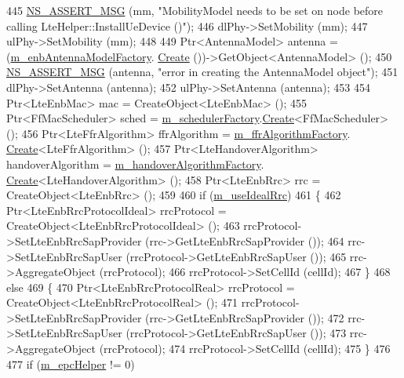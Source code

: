 \begin{DoxyCode}
445   \hyperlink{assert_8h_aff5ece9066c74e681e74999856f08539}{NS\_ASSERT\_MSG} (mm, \textcolor{stringliteral}{"MobilityModel needs to be set on node before calling
       LteHelper::InstallUeDevice ()"});
446   dlPhy->SetMobility (mm);
447   ulPhy->SetMobility (mm);
448 
449   Ptr<AntennaModel> antenna = (\hyperlink{classns3_1_1LteHelper_af5ae4f0a3c7ea76ee9cdb2a13a7b296c}{m\_enbAntennaModelFactory}.
      \hyperlink{classns3_1_1ObjectFactory_a18152e93f0a6fe184ed7300cb31e9896}{Create} ())->GetObject<AntennaModel> ();
450   \hyperlink{assert_8h_aff5ece9066c74e681e74999856f08539}{NS\_ASSERT\_MSG} (antenna, \textcolor{stringliteral}{"error in creating the AntennaModel object"});
451   dlPhy->SetAntenna (antenna);
452   ulPhy->SetAntenna (antenna);
453 
454   Ptr<LteEnbMac> mac = CreateObject<LteEnbMac> ();
455   Ptr<FfMacScheduler> sched = \hyperlink{classns3_1_1LteHelper_a22e061dea6e6e1236216ced92bbfb3f2}{m\_schedulerFactory}.\hyperlink{classns3_1_1ObjectFactory_a18152e93f0a6fe184ed7300cb31e9896}{Create}<FfMacScheduler> ();
456   Ptr<LteFfrAlgorithm> ffrAlgorithm = \hyperlink{classns3_1_1LteHelper_a26739b9eded6b728e7fe5077db758764}{m\_ffrAlgorithmFactory}.
      \hyperlink{classns3_1_1ObjectFactory_a18152e93f0a6fe184ed7300cb31e9896}{Create}<LteFfrAlgorithm> ();
457   Ptr<LteHandoverAlgorithm> handoverAlgorithm = \hyperlink{classns3_1_1LteHelper_a32db920fb44f4b65250e3cc23eeadd77}{m\_handoverAlgorithmFactory}.
      \hyperlink{classns3_1_1ObjectFactory_a18152e93f0a6fe184ed7300cb31e9896}{Create}<LteHandoverAlgorithm> ();
458   Ptr<LteEnbRrc> rrc = CreateObject<LteEnbRrc> ();
459 
460   \textcolor{keywordflow}{if} (\hyperlink{classns3_1_1LteHelper_ab230ddf0db292c4ea6482e80bac0d53a}{m\_useIdealRrc})
461     \{
462       Ptr<LteEnbRrcProtocolIdeal> rrcProtocol = CreateObject<LteEnbRrcProtocolIdeal> ();
463       rrcProtocol->SetLteEnbRrcSapProvider (rrc->GetLteEnbRrcSapProvider ());
464       rrc->SetLteEnbRrcSapUser (rrcProtocol->GetLteEnbRrcSapUser ());
465       rrc->AggregateObject (rrcProtocol);
466       rrcProtocol->SetCellId (cellId);
467     \}
468   \textcolor{keywordflow}{else}
469     \{
470       Ptr<LteEnbRrcProtocolReal> rrcProtocol = CreateObject<LteEnbRrcProtocolReal> ();
471       rrcProtocol->SetLteEnbRrcSapProvider (rrc->GetLteEnbRrcSapProvider ());
472       rrc->SetLteEnbRrcSapUser (rrcProtocol->GetLteEnbRrcSapUser ());
473       rrc->AggregateObject (rrcProtocol);
474       rrcProtocol->SetCellId (cellId);
475     \}
476 
477   \textcolor{keywordflow}{if} (\hyperlink{classns3_1_1LteHelper_aeec42671d76d5bd719b37d77bfd27633}{m\_epcHelper} != 0)

\end{DoxyCode}
